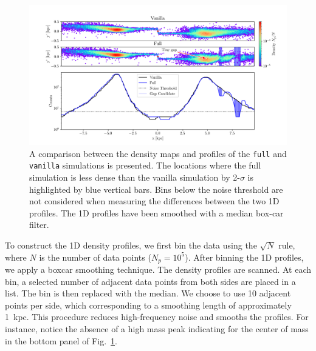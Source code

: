 \documentclass[draft]{aa}
\begin{document}
      \begin{figure}
        \centering
        \includegraphics[width=\linewidth, trim=20 0 15 0]{monte-carlo-009-pouliasis2017pii-GCNBody-2000-milisigma-5-noisefactor-20-boxcarindexlength-shifted-0.png}
        \caption{A comparison between the density maps and profiles of the \texttt{full} and \texttt{vanilla} simulations is presented. The locations where the full simulation is less dense than the vanilla simulation by 2-$\sigma$ is highlighted by blue vertical bars. Bins below the noise threshold are not considered when measuring the differences between the two 1D profiles. The 1D profiles have been smoothed with a median box-car filter.}
        \label{fig:profiles}
        \end{figure}

      To construct the 1D density profiles, we first bin the data using the $\sqrt{N}$ rule, where $N$ is the number of data points ($N_p = 10^5$). After binning the 1D profiles, we apply a boxcar smoothing technique. The density profiles are scanned. At each bin, a selected number of adjacent data points from both sides are placed in a list. The bin is then replaced with the median. We choose to use 10 adjacent points per side, which corresponding to a smoothing length of approximately 1~kpc. This procedure reduces high-frequency noise and smooths the profiles. For instance, notice the absence of a high mass peak indicating for the center of mass in the bottom panel of Fig.~\ref{fig:profiles}.
\end{document}
